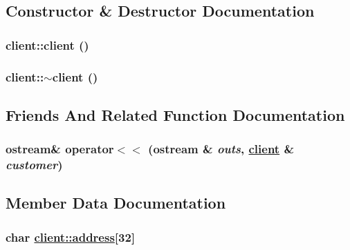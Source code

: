 \subsection{Constructor \& Destructor Documentation}
\hypertarget{classclient_b53a10e7f29eac1a359e54efc484e96e}{
\subsubsection[client]{\setlength{\rightskip}{0pt plus 5cm}client::client ()}}
\label{classclient_b53a10e7f29eac1a359e54efc484e96e}


\hypertarget{classclient_f615a256c40006da0684c8baae2da7cb}{
\subsubsection[$\sim$client]{\setlength{\rightskip}{0pt plus 5cm}client::$\sim$client ()}}
\label{classclient_f615a256c40006da0684c8baae2da7cb}




\subsection{Friends And Related Function Documentation}
\hypertarget{classclient_9f09335faadcf7eaacdcd326c26f5d99}{
\subsubsection[operator$<$$<$]{\setlength{\rightskip}{0pt plus 5cm}ostream\& operator$<$$<$ (ostream \& {\em outs}, \hyperlink{classclient}{client} \& {\em customer})}}
\label{classclient_9f09335faadcf7eaacdcd326c26f5d99}




\subsection{Member Data Documentation}
\hypertarget{classclient_06a8d016fa013b9fc60bcc24da937701}{
\subsubsection[address]{\setlength{\rightskip}{0pt plus 5cm}char \hyperlink{classclient_06a8d016fa013b9fc60bcc24da937701}{client::address}\mbox{[}32\mbox{]}}}
\label{classclient_06a8d016fa013b9fc60bcc24da937701}


